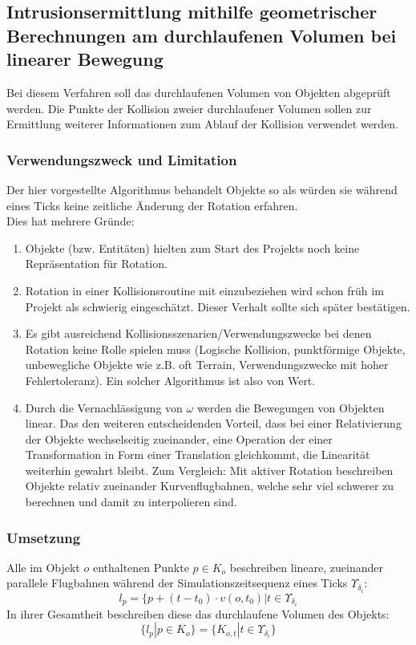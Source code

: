 \subsection{Intrusionsermittlung mithilfe geometrischer Berechnungen am durchlaufenen Volumen bei linearer Bewegung}
\label{sec:linear_int}
Bei diesem Verfahren soll das durchlaufenen Volumen von Objekten abgeprüft werden. Die Punkte der Kollision zweier durchlaufener Volumen sollen zur Ermittlung weiterer Informationen zum Ablauf der Kollision verwendet werden.
\subsubsection{Verwendungszweck und Limitation}
Der hier vorgestellte Algorithmus behandelt Objekte so als würden sie während eines Ticks keine zeitliche Änderung der Rotation erfahren.\\
Dies hat mehrere Gründe:
\begin{enumerate}
\item Objekte (bzw. Entitäten) hielten zum Start des Projekts noch keine Repräsentation für Rotation.
\item Rotation in einer Kollisionsroutine mit einzubeziehen wird schon früh im Projekt als schwierig eingeschätzt. Dieser Verhalt sollte sich später bestätigen.
\item Es gibt ausreichend Kollisionsszenarien/Verwendungszwecke bei denen Rotation keine Rolle spielen muss (Logische Kollision, punktförmige Objekte, unbewegliche Objekte wie z.B. oft Terrain, Verwendungszwecke mit hoher Fehlertoleranz). Ein solcher Algorithmus ist also von Wert.
\item Durch die Vernachlässigung von $\omega$ werden die Bewegungen von Objekten linear. Das den weiteren entscheidenden Vorteil, dass bei einer Relativierung der Objekte wechselseitig zueinander, eine Operation der einer Transformation in Form einer Translation gleichkommt, die Linearität weiterhin gewahrt bleibt. Zum Vergleich: Mit aktiver Rotation beschreiben Objekte relativ zueinander Kurvenflugbahnen, welche sehr viel schwerer zu berechnen und damit zu interpolieren sind.\\
\end{enumerate}

\subsubsection{Umsetzung}
Alle im Objekt $o$ enthaltenen Punkte $p \in K_o$ beschreiben lineare, zueinander parallele Flugbahnen während der Simulationszeitsequenz eines Ticks $\Upsilon_{\delta_i}$:
$$l_p = \{p + (t - t_0) \cdot v(o, t_0) | t \in \Upsilon_{\delta_i} $$
In ihrer Gesamtheit beschreiben diese das durchlaufene Volumen des Objekts:
$$\{l_p|p\in K_o\} = \{K_{o, t}| t \in \Upsilon_{\delta_i}\}$$

